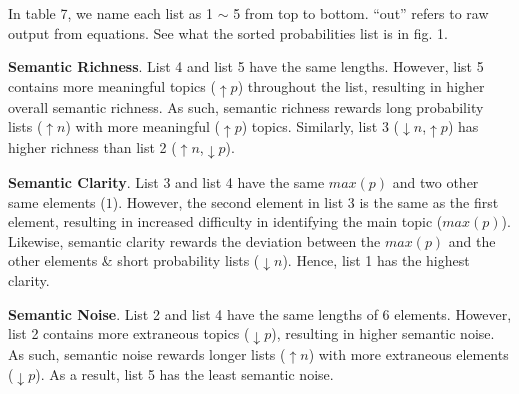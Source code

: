 \documentclass[11pt]{article}
\begin{document}
In table 7, we name each list as 1 $\sim$ 5 from top to bottom. ``out'' refers to raw output from equations. See what the sorted probabilities list is in fig. 1.

\textbf{Semantic Richness}. List 4  and list 5 have the same lengths. However, list 5 contains more meaningful topics ($\uparrow p$) throughout the list, resulting in higher overall semantic richness. As such, semantic richness rewards long probability lists ($\uparrow n$) with more meaningful ($\uparrow p$) topics. Similarly, list 3 ($\downarrow n$,$\uparrow p$) has higher richness than list 2 ($\uparrow n$,$\downarrow p$).

\textbf{Semantic Clarity}. List 3 and list 4 have the same $max(p)$ and two other same elements ($1$). However, the second element in list 3 is the same as the first element, resulting in increased difficulty in identifying the main topic ($max(p)$). Likewise, semantic clarity rewards the deviation between the $max(p)$ and the other elements \& short probability lists ($\downarrow n$). Hence, list 1 has the highest clarity.

\textbf{Semantic Noise}. List 2 and list 4 have the same lengths of 6 elements. However, list 2 contains more extraneous topics ($\downarrow p$), resulting in higher semantic noise. As such, semantic noise rewards longer lists ($\uparrow n$) with more extraneous elements ($\downarrow p$). As a result, list 5 has the least semantic noise.
\end{document}
